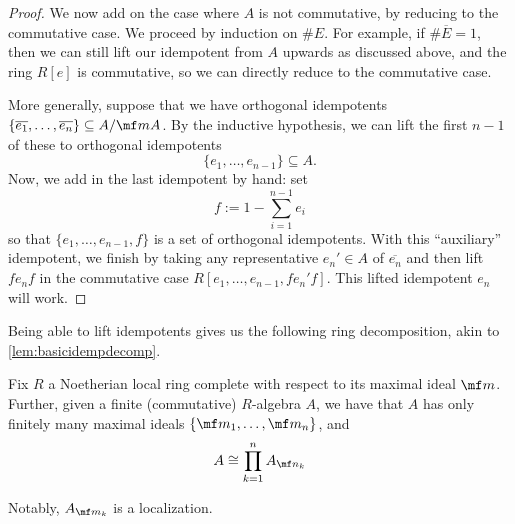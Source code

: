 \documentclass[../notes.tex]{subfiles}
\begin{document}
\begin{proof}
	We now add on the case where $A$ is not commutative, by reducing to the commutative case. We proceed by induction on $\#E$. For example, if $\#\overline E=1$, then we can still lift our idempotent from $A$ upwards as discussed above, and the ring $R[e]$ is commutative, so we can directly reduce to the commutative case.

	More generally, suppose that we have orthogonal idempotents $\{\overline{e_1},\ldots,\overline{e_n}\}\subseteq A/\mf mA$. By the inductive hypothesis, we can lift the first $n-1$ of these to orthogonal idempotents
	\[\{e_1,\ldots,e_{n-1}\}\subseteq A.\]
	Now, we add in the last idempotent by hand: set
	\[f:=1-\sum_{i=1}^{n-1}e_i\]
	so that $\{e_1,\ldots,e_{n-1},f\}$ is a set of orthogonal idempotents. With this ``auxiliary'' idempotent, we finish by taking any representative $e_n'\in A$ of $\overline{e_n}$ and then lift $fe_nf$ in the commutative case $R[e_1,\ldots,e_{n-1},fe_n'f]$. This lifted idempotent $e_n$ will work. %
\end{proof}
Being able to lift idempotents gives us the following ring decomposition, akin to \autoref{lem:basicidempdecomp}.
\begin{lemma}
	Fix $R$ a Noetherian local ring complete with respect to its maximal ideal $\mf m$. Further, given a finite (commutative) $R$-algebra $A$, we have that $A$ has only finitely many maximal ideals $\{\mf m_1,\ldots,\mf m_n\}$, and
	\[A\cong\prod_{k=1}^nA_{\mf n_k}\]
\end{lemma}
Notably, $A_{\mf m_k}$ is a localization.
\end{document}
